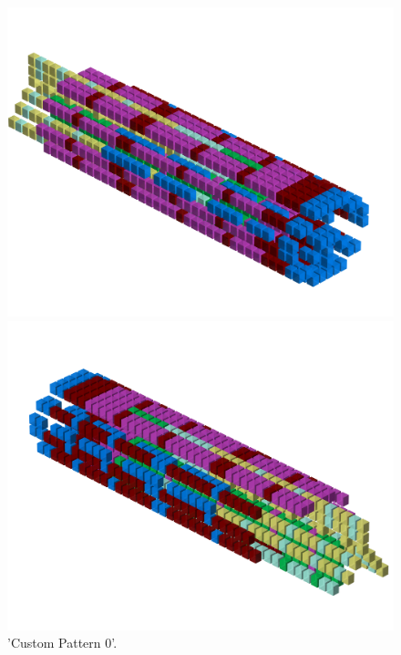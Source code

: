 \begin{figure}[H]
    \centering
    \begin{adjustbox}{width=12cm,center}
      \includegraphics[width=12cm]{src/patterns/pattern8-45.png}%
    \end{adjustbox}
    \begin{adjustbox}{width=12cm,margin=0cm -4cm}
      \includegraphics[width=12cm]{src/patterns/pattern8-225.png}%
    \end{adjustbox}
\caption{'Custom Pattern 0'.}
\end{figure}
\clearpage

